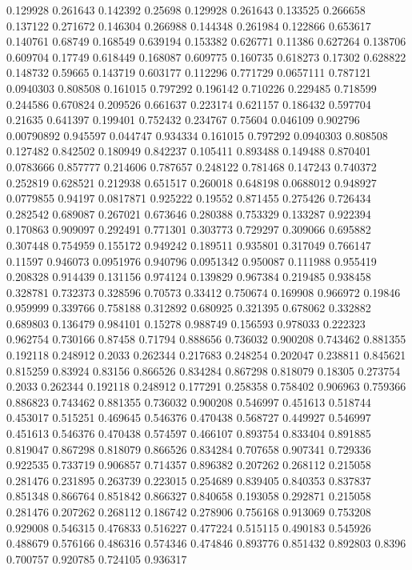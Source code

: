 0.129928 0.261643
0.142392 0.25698
0.129928 0.261643
0.133525 0.266658
0.137122 0.271672
0.146304 0.266988
0.144348 0.261984
0.122866 0.653617
0.140761 0.68749
0.168549 0.639194
0.153382 0.626771
0.11386 0.627264
0.138706 0.609704
0.17749 0.618449
0.168087 0.609775
0.160735 0.618273
0.17302 0.628822
0.148732 0.59665
0.143719 0.603177
0.112296 0.771729
0.0657111 0.787121
0.0940303 0.808508
0.161015 0.797292
0.196142 0.710226
0.229485 0.718599
0.244586 0.670824
0.209526 0.661637
0.223174 0.621157
0.186432 0.597704
0.21635 0.641397
0.199401 0.752432
0.234767 0.75604
0.046109 0.902796
0.00790892 0.945597
0.044747 0.934334
0.161015 0.797292
0.0940303 0.808508
0.127482 0.842502
0.180949 0.842237
0.105411 0.893488
0.149488 0.870401
0.0783666 0.857777
0.214606 0.787657
0.248122 0.781468
0.147243 0.740372
0.252819 0.628521
0.212938 0.651517
0.260018 0.648198
0.0688012 0.948927
0.0779855 0.94197
0.0817871 0.925222
0.19552 0.871455
0.275426 0.726434
0.282542 0.689087
0.267021 0.673646
0.280388 0.753329
0.133287 0.922394
0.170863 0.909097
0.292491 0.771301
0.303773 0.729297
0.309066 0.695882
0.307448 0.754959
0.155172 0.949242
0.189511 0.935801
0.317049 0.766147
0.11597 0.946073
0.0951976 0.940796
0.0951342 0.950087
0.111988 0.955419
0.208328 0.914439
0.131156 0.974124
0.139829 0.967384
0.219485 0.938458
0.328781 0.732373
0.328596 0.70573
0.33412 0.750674
0.169908 0.966972
0.19846 0.959999
0.339766 0.758188
0.312892 0.680925
0.321395 0.678062
0.332882 0.689803
0.136479 0.984101
0.15278 0.988749
0.156593 0.978033
0.222323 0.962754
0.730166 0.87458
0.71794 0.888656
0.736032 0.900208
0.743462 0.881355
0.192118 0.248912
0.2033 0.262344
0.217683 0.248254
0.202047 0.238811
0.845621 0.815259
0.83924 0.83156
0.866526 0.834284
0.867298 0.818079
0.18305 0.273754
0.2033 0.262344
0.192118 0.248912
0.177291 0.258358
0.758402 0.906963
0.759366 0.886823
0.743462 0.881355
0.736032 0.900208
0.546997 0.451613
0.518744 0.453017
0.515251 0.469645
0.546376 0.470438
0.568727 0.449927
0.546997 0.451613
0.546376 0.470438
0.574597 0.466107
0.893754 0.833404
0.891885 0.819047
0.867298 0.818079
0.866526 0.834284
0.707658 0.907341
0.729336 0.922535
0.733719 0.906857
0.714357 0.896382
0.207262 0.268112
0.215058 0.281476
0.231895 0.263739
0.223015 0.254689
0.839405 0.840353
0.837837 0.851348
0.866764 0.851842
0.866327 0.840658
0.193058 0.292871
0.215058 0.281476
0.207262 0.268112
0.186742 0.278906
0.756168 0.913069
0.753208 0.929008
0.546315 0.476833
0.516227 0.477224
0.515115 0.490183
0.545926 0.488679
0.576166 0.486316
0.574346 0.474846
0.893776 0.851432
0.892803 0.8396
0.700757 0.920785
0.724105 0.936317
